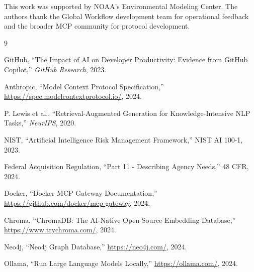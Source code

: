 \documentclass[11pt,twocolumn]{article}
\begin{document}
This work was supported by NOAA's Environmental Modeling Center. The authors thank the Global Workflow development team for operational feedback and the broader MCP community for protocol development.

\begin{thebibliography}{9}

GitHub, ``The Impact of AI on Developer Productivity: Evidence from GitHub Copilot,'' \textit{GitHub Research}, 2023.

Anthropic, ``Model Context Protocol Specification,'' \url{https://spec.modelcontextprotocol.io/}, 2024.

P. Lewis et al., ``Retrieval-Augmented Generation for Knowledge-Intensive NLP Tasks,'' \textit{NeurIPS}, 2020.

NIST, ``Artificial Intelligence Risk Management Framework,'' NIST AI 100-1, 2023.

Federal Acquisition Regulation, ``Part 11 - Describing Agency Needs,'' 48 CFR, 2024.

Docker, ``Docker MCP Gateway Documentation,'' \url{https://github.com/docker/mcp-gateway}, 2024.

Chroma, ``ChromaDB: The AI-Native Open-Source Embedding Database,'' \url{https://www.trychroma.com/}, 2024.

Neo4j, ``Neo4j Graph Database,'' \url{https://neo4j.com/}, 2024.

Ollama, ``Run Large Language Models Locally,'' \url{https://ollama.com/}, 2024.

\end{thebibliography}
\end{document}
